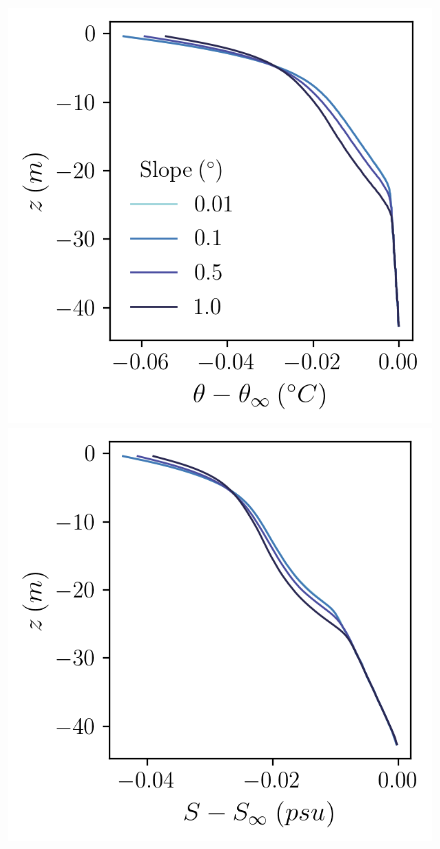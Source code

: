 \documentclass[draft]{agujournal2019}
\begin{document}
\begin{figure}[h!]
    \centering
    \begin{minipage}{0.33\textwidth}
        \includegraphics[trim={0 4cm 0 0},clip, width=\textwidth]{Figures/pt_cmp_dslope_43h_tav13h_z_profile.png}
    \end{minipage}%
    \begin{minipage}{0.33\textwidth}
        \includegraphics[trim={0 4cm 0 0},clip, width=\textwidth]{Figures/sa_cmp_dslope_43h_tav13h_z_profile.png}

\end{minipage}
\end{figure}
\end{document}
